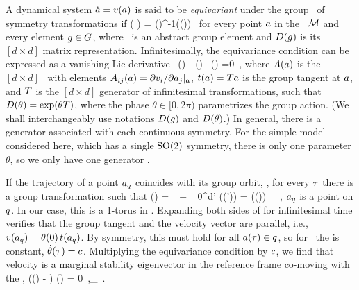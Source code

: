 \documentclass[aip,cha,
reprint,
secnumarabic,
nofootinbib, tightenlines,
nobibnotes, showkeys, showpacs,
superscriptaddress,
]{revtex4-1}
\begin{document}
A dynamical system $\dot{a}={v}(a)$ is said to be
\emph{equivariant} under the group \Group\ of symmetry transformations if
\beq
	\vel( \ssp )
    =  \matrixRep(\LieEl)^{-1}\vel(\matrixRep(\LieEl)\ssp)
	\,
for every point $a$ in the \statesp\ ${\cal M}$ and every element $g \in
G$, where \LieEl\ is an abstract group element and
${D}(g)$ is its $[d\!\times\!d]$ matrix representation.
Infinitesimally, the equivariance condition  can be expressed as
a vanishing Lie derivative
\beq
  \Lg \, \vel(\ssp)  - \Mvar(\ssp) \, \groupTan(\ssp) =0
  \,,
where
${A}(a)$ is the $[d\!\times\!d]$ \stabmat\, with elements
${A}_{ij}(a)={\partial {v}_i}/{\partial a_j}|_{a}$, $ t(a)
= {T} a $ is the group tangent at $a$, and ${T}$ is the
$[d\!\times\!d]$ generator of infinitesimal transformations, such that
${D}(\theta) = \exp(\theta{T})$, where the phase $\theta \in [0,2\pi)$
parametrizes the group action. (We shall interchangeably use notations
${D}(g)$ and ${D}(\theta)$.) In general, there is a
generator associated with each continuous symmetry. For the simple model 
considered here, which has a single $\textrm{SO}(2)$ symmetry, there is only one 
parameter $\theta$, so we only have one generator \Lg.

If the trajectory of a point $a_q$ coincides with its group
orbit, \ie, for every $\tau$ there is a group transformation such that
\beq
\ssp (\zeit)
    = \ssp_\stagn + \int_0^\zeit \!\!d\zeit' \vel(\ssp (\zeit'))
    = \matrixRep(\theta (\zeit))\,\ssp_\stagn
  \,,
$a_q$ is a point on \emph{\reqv} $q$. In our case, this is a 
1-torus in \statesp. Expanding both sides of  for infinitesimal time
verifies that the group tangent and the velocity vector are parallel, i.e.,
 ${v}(a_q) = \dot{\theta}(0) \, t(a_q)$.
By symmetry, this must hold for all $a(\tau) \in q$, so for \reqva\
the \emph{\phaseVel} is constant, $\dot{\theta}(\tau) = c$.
Multiplying the equivariance condition \refeq{inftmInv} by $c$, we
find that velocity is a marginal stability eigenvector in the reference frame co-moving 
with the \reqv,
\beq
(\Mvar (\ssp) - \velRel \Lg) \vel (\ssp) = 0
\,,\qquad \ssp \in \pS_\stagn
\,.
\end{document}

